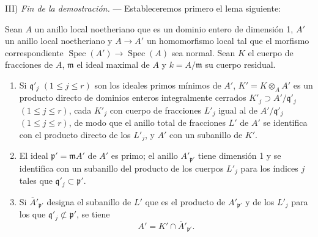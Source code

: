 III) \emph{Fin de la demostración.} --- Estableceremos primero el lema
siguiente:

\begin{lemma}[6.14.1.2]
\label{IV.2.s6.14.1.2-fr}
Sean $A$ un anillo local noetheriano que es un dominio entero de
dimensión 1, $A'$ un anillo local noetheriano y $A\to A'$ un
homomorfismo local tal que el morfismo correspondiente
$\operatorname{Spec}(A')\to\operatorname{Spec}(A)$ sea normal. Sean $K$
el cuerpo de fracciones de $A$, $\mathfrak m$ el ideal maximal de $A$
y $k=A/\mathfrak m$ su cuerpo residual.
\begin{enumerate}
\item[\textup{(i)}] Si $\mathfrak q'_j$ $(1\leqslant j\leqslant r)$ son los
ideales primos mínimos de $A'$, $K'=K\otimes_A A'$ es un producto directo
de dominios enteros integralmente cerrados $K'_j\supset A'/\mathfrak q'_j$ $(1\leqslant j\leqslant r)$, cada $K'_j$ con cuerpo de fracciones $L'_j$ igual al de
$A'/\mathfrak q'_j$ $(1\leqslant j\leqslant r)$, de modo que el anillo total de fracciones $L'$ de $A'$ se identifica con
el producto directo de los $L'_j$, y $A'$ con un subanillo de $K'$.
\item[\textup{(ii)}] El ideal $\mathfrak p'=\mathfrak mA'$ de $A'$ es primo; el
anillo $A'_{\mathfrak p'}$ tiene dimensión 1 y se identifica con un
subanillo del producto de los cuerpos $L'_j$ para los índices $j$
tales que $\mathfrak q'_j\subset\mathfrak p'$.
\item[\textup{(iii)}] Si $\overline{A}'_{\mathfrak p'}$ designa el subanillo de
$L'$ que es el producto de $A'_{\mathfrak p'}$ y de los $L'_j$ para
los que $\mathfrak q'_j\not\subset\mathfrak p'$, se tiene
\begin{equation}
\tag{6.14.1.3}
\label{IV.2.s6.14.1.3-fr}
A'=K'\cap\overline{A}'_{\mathfrak p'}.
\end{equation}
\end{enumerate}
\end{lemma}
